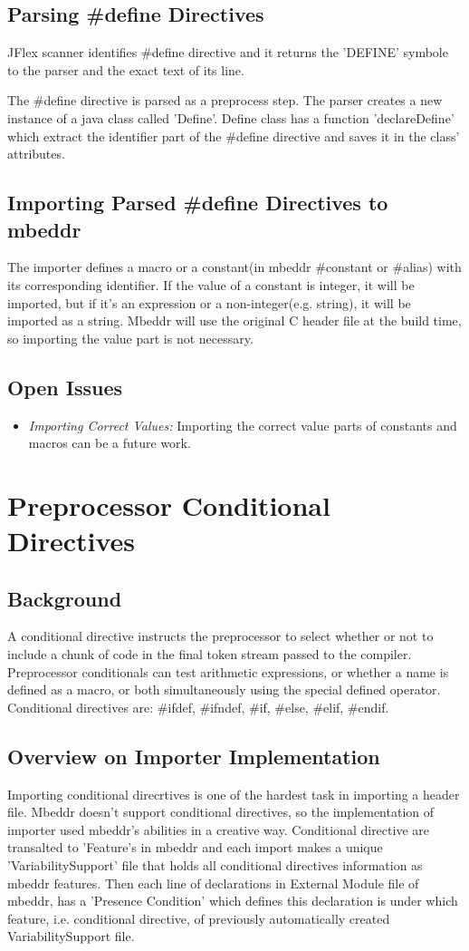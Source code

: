 \documentclass[titlepage]{article}
\begin{document}
\subsection{Parsing \#define Directives}
JFlex scanner identifies \#define directive and it returns the 'DEFINE' symbole to the parser and the exact text of its line.

The \#define directive is parsed as a preprocess step. The parser creates a new instance of a java class called 'Define'. Define class has a function 'declareDefine' which extract the identifier part of the \#define directive and saves it in the class' attributes.

\subsection{Importing Parsed \#define Directives to mbeddr}
The importer defines a macro or a constant(in mbeddr \#constant or \#alias) with its corresponding identifier. If the value of a constant is integer, it will be imported, but if it's an expression or a non-integer(e.g. string), it will be imported as a string. Mbeddr will use the original C header file at the build time, so importing the value part is not necessary.
\subsection{Open Issues}
\begin{itemize}
\item \emph{Importing Correct Values:} Importing the correct value parts of constants and macros can be a future work.
\end{itemize}

\section{Preprocessor Conditional Directives}
\subsection{Background}
A conditional directive instructs the preprocessor to select whether or not to include a chunk of code in the final token stream passed to the compiler. Preprocessor conditionals can test arithmetic expressions, or whether a name is defined as a macro, or both simultaneously using the special defined operator. Conditional directives are: \#ifdef, \#ifndef, \#if, \#else, \#elif, \#endif.
\subsection{Overview on Importer Implementation}
Importing conditional direcrtives is one of the hardest task in importing a header file. Mbeddr doesn't support conditional directives, so the implementation of importer used mbeddr's abilities in a creative way. Conditional directive are transalted to 'Feature's in mbeddr and each import makes a unique 'VariabilitySupport' file that holds all conditional directives information as mbeddr features. Then each line of declarations in External Module file of mbeddr, has a 'Presence Condition' which defines this declaration is under which feature, i.e. conditional directive, of previously automatically created VariabilitySupport file.
\end{document}
